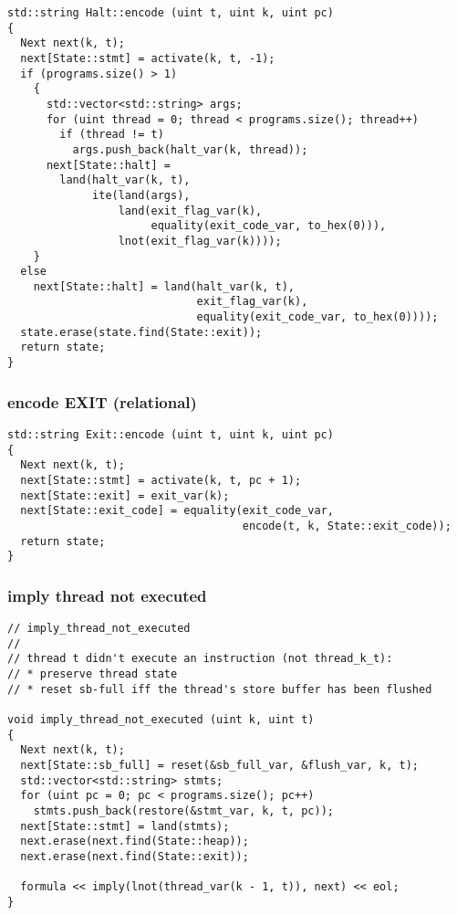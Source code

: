 \begin{lstlisting}[style=c++]
std::string Halt::encode (uint t, uint k, uint pc)
{
  Next next(k, t);
  next[State::stmt] = activate(k, t, -1);
  if (programs.size() > 1)
    {
      std::vector<std::string> args;
      for (uint thread = 0; thread < programs.size(); thread++)
        if (thread != t)
          args.push_back(halt_var(k, thread));
      next[State::halt] =
        land(halt_var(k, t),
             ite(land(args),
                 land(exit_flag_var(k),
                      equality(exit_code_var, to_hex(0))),
                 lnot(exit_flag_var(k))));
    }
  else
    next[State::halt] = land(halt_var(k, t),
                             exit_flag_var(k),
                             equality(exit_code_var, to_hex(0))));
  state.erase(state.find(State::exit));
  return state;
}
\end{lstlisting}

\subsubsection{encode EXIT (relational)}

\begin{lstlisting}[style=c++]
std::string Exit::encode (uint t, uint k, uint pc)
{
  Next next(k, t);
  next[State::stmt] = activate(k, t, pc + 1);
  next[State::exit] = exit_var(k);
  next[State::exit_code] = equality(exit_code_var,
                                    encode(t, k, State::exit_code));
  return state;
}
\end{lstlisting}

\subsubsection{imply thread not executed}

\begin{lstlisting}[style=c++]
// imply_thread_not_executed
//
// thread t didn't execute an instruction (not thread_k_t):
// * preserve thread state
// * reset sb-full iff the thread's store buffer has been flushed

void imply_thread_not_executed (uint k, uint t)
{
  Next next(k, t);
  next[State::sb_full] = reset(&sb_full_var, &flush_var, k, t);
  std::vector<std::string> stmts;
  for (uint pc = 0; pc < programs.size(); pc++)
    stmts.push_back(restore(&stmt_var, k, t, pc));
  next[State::stmt] = land(stmts);
  next.erase(next.find(State::heap));
  next.erase(next.find(State::exit));

  formula << imply(lnot(thread_var(k - 1, t)), next) << eol;
}
\end{lstlisting}

